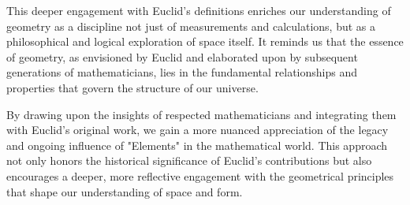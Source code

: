 This deeper engagement with Euclid’s definitions enriches our understanding of geometry as a discipline not just of measurements and calculations, but as a philosophical and logical exploration of space itself. It reminds us that the essence of geometry, as envisioned by Euclid and elaborated upon by subsequent generations of mathematicians, lies in the fundamental relationships and properties that govern the structure of our universe.

By drawing upon the insights of respected mathematicians and integrating them with Euclid’s original work, we gain a more nuanced appreciation of the legacy and ongoing influence of "Elements" in the mathematical world. This approach not only honors the historical significance of Euclid’s contributions but also encourages a deeper, more reflective engagement with the geometrical principles that shape our understanding of space and form.


\clearpage